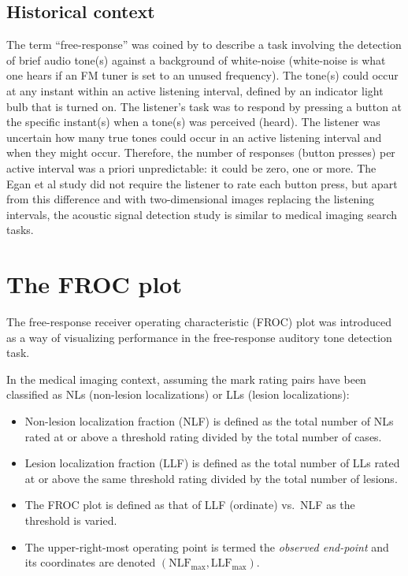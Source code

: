 \documentclass[
]{book}
\begin{document}
\hypertarget{historical-context}{%
\subsection{Historical context}\label{historical-context}}

The term ``free-response'' was coined by \citep{RN897} to describe a task involving the detection of brief audio tone(s) against a background of white-noise (white-noise is what one hears if an FM tuner is set to an unused frequency). The tone(s) could occur at any instant within an active listening interval, defined by an indicator light bulb that is turned on. The listener's task was to respond by pressing a button at the specific instant(s) when a tone(s) was perceived (heard). The listener was uncertain how many true tones could occur in an active listening interval and when they might occur. Therefore, the number of responses (button presses) per active interval was a priori unpredictable: it could be zero, one or more. The Egan et al study did not require the listener to rate each button press, but apart from this difference and with two-dimensional images replacing the listening intervals, the acoustic signal detection study is similar to medical imaging search tasks.

\hypertarget{froc-paradigm-froc-plot}{%
\section{The FROC plot}\label{froc-paradigm-froc-plot}}

The free-response receiver operating characteristic (FROC) plot was introduced \citep{RN2104} as a way of visualizing performance in the free-response auditory tone detection task.

In the medical imaging context, assuming the mark rating pairs have been classified as NLs (non-lesion localizations) or LLs (lesion localizations):

\begin{itemize}
\item
  Non-lesion localization fraction (NLF) is defined as the total number of NLs rated at or above a threshold rating divided by the total number of cases.
\item
  Lesion localization fraction (LLF) is defined as the total number of LLs rated at or above the same threshold rating divided by the total number of lesions.
\item
  The FROC plot is defined as that of LLF (ordinate) vs.~NLF as the threshold is varied.
\item
  The upper-right-most operating point is termed the \emph{observed end-point} and its coordinates are denoted \((\text{NLF}_{\text{max}}, \text{LLF}_{\text{max}})\).
\end{itemize}
\end{document}
